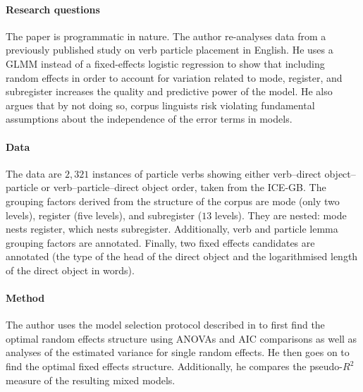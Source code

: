 \begin{svgraybox}
  \textbf{\citet{Gries2015}}

  \vspace{-\baselineskip}\paragraph{Research questions}\vspace{-0.5\baselineskip}
  
  The paper is programmatic in nature.
  The author re-analyses data from a previously published study on verb particle placement in English.
  He uses a GLMM instead of a fixed-effects logistic regression to show that including random effects in order to account for variation related to mode, register, and subregister increases the quality and predictive power of the model.
  He also argues that by not doing so, corpus linguists risk violating fundamental assumptions about the independence of the error terms in models.
  
  \vspace{-\baselineskip}\paragraph{Data}\vspace{-0.5\baselineskip}
  
  The data are $2,321$ instances of particle verbs showing either verb--direct object--particle or verb--particle--direct object order, taken from the ICE-GB.
  The grouping factors derived from the structure of the corpus are mode (only two levels), register (five levels), and subregister ($13$ levels).
  They are nested: mode nests register, which nests subregister.
  Additionally, verb and particle lemma grouping factors are annotated.
  Finally, two fixed effects candidates are annotated (the type of the head of the direct object and the logarithmised length of the direct object in words).
 
  \vspace{-\baselineskip}\paragraph{Method}\vspace{-0.5\baselineskip}
  
  The author uses the model selection protocol described in \citet{ZuurEa2009} to first find the optimal random effects structure using ANOVAs and AIC comparisons as well as analyses of the estimated variance for single random effects.
  He then goes on to find the optimal fixed effects structure.
  Additionally, he compares the pseudo-$R^2$ measure of the resulting mixed models.
 

\end{svgraybox}
